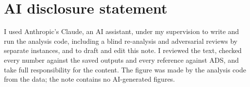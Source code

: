 \documentclass{aastex701}
\begin{document}

\section*{AI disclosure statement}
I used Anthropic's Claude, an AI assistant, under my supervision to write and run the analysis code,
including a blind re-analysis and adversarial reviews by separate instances, and to draft and edit this note.
I reviewed the text, checked every number against the saved outputs and every reference against ADS, and take
full responsibility for the content. The figure was made by the analysis code from the data; the note contains
no AI-generated figures.
\end{document}
